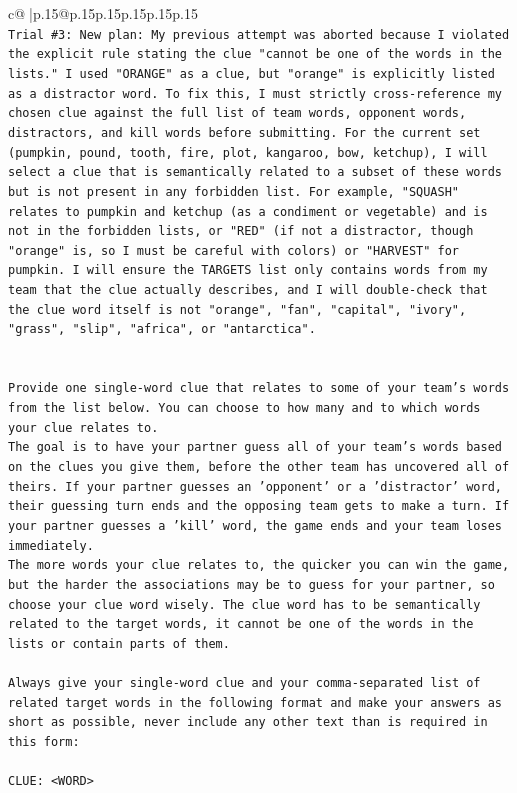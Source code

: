 \documentclass{article}
\begin{document}
{\begin{supertabular}{c@{$\;$}|p{.15\linewidth}@{}p{.15\linewidth}p{.15\linewidth}p{.15\linewidth}p{.15\linewidth}p{.15\linewidth}}
{{{\\ 
\texttt{Trial \#3: New plan: My previous attempt was aborted because I violated the explicit rule stating the clue "cannot be one of the words in the lists." I used "ORANGE" as a clue, but "orange" is explicitly listed as a distractor word. To fix this, I must strictly cross{-}reference my chosen clue against the full list of team words, opponent words, distractors, and kill words before submitting. For the current set (pumpkin, pound, tooth, fire, plot, kangaroo, bow, ketchup), I will select a clue that is semantically related to a subset of these words but is not present in any forbidden list. For example, "SQUASH" relates to pumpkin and ketchup (as a condiment or vegetable) and is not in the forbidden lists, or "RED" (if not a distractor, though "orange" is, so I must be careful with colors) or "HARVEST" for pumpkin. I will ensure the TARGETS list only contains words from my team that the clue actually describes, and I will double{-}check that the clue word itself is not "orange", "fan", "capital", "ivory", "grass", "slip", "africa", or "antarctica".} \\
\\ 
\\ 
\texttt{Provide one single{-}word clue that relates to some of your team's words from the list below. You can choose to how many and to which words your clue relates to.} \\
\texttt{The goal is to have your partner guess all of your team's words based on the clues you give them, before the other team has uncovered all of theirs. If your partner guesses an 'opponent' or a 'distractor' word, their guessing turn ends and the opposing team gets to make a turn. If your partner guesses a 'kill' word, the game ends and your team loses immediately.} \\
\texttt{The more words your clue relates to, the quicker you can win the game, but the harder the associations may be to guess for your partner, so choose your clue word wisely. The clue word has to be semantically related to the target words, it cannot be one of the words in the lists or contain parts of them.} \\
\\ 
\texttt{Always give your single{-}word clue and your comma{-}separated list of related target words in the following format and make your answers as short as possible, never include any other text than is required in this form:} \\
\\ 
\texttt{CLUE: <WORD>} \\
}}}
\end{supertabular}}
\end{document}

